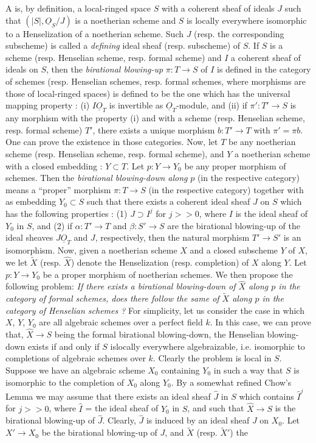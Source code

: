 A is, by definition, a local-ringed space $S$ with a coherent sheaf of ideals $J$ such that $(|S|,\underline{O}_{S}/J)$ is a noetherian scheme and $S$ is locally everywhere isomorphic to a Henselization of a noetherian scheme. Such $J$ (resp. the corresponding subscheme) is called a {\em defining} ideal sheaf (resp. subscheme) of $S$. If $S$ is a scheme (resp. Henselian scheme, resp. formal scheme) and $I$ a coherent sheaf of ideals on $S$, then the {\em birational blowing-up} $\pi:T\to S$ of $I$ is defined in the category of schemes (resp. Henselian schemes, resp. formal schemes, where morphisms are those of local-ringed spaces) is defined to be the one which has the universal mapping property : (i) $I\underline{O}_{T}$ is invertible as $\underline{O}_{T}$-module, and (ii) if $\pi':T'\to S$ is any morphism with the property (i) and with a scheme (resp. Henselian scheme, resp. formal scheme) $T'$, there exists a unique morphism $b:T'\to T$ with $\pi'=\pi b$. One can prove the existence in those categories. Now, let $T$ be any noetherian scheme (resp. Henselian scheme, resp. formal scheme), and $Y$ a noetherian scheme with a closed embedding : $Y\subset T$. Let $p:Y\to Y_{0}$ be any proper morphism of schemes. Then the {\em birational blowing-down along} $p$ (in the respective category) means a ``proper'' morphism $\pi:T\to S$ (in the respective category) together with as embedding $Y_{0}\subset S$ such that there exists a coherent ideal sheaf $J$ on $S$ which has the following properties : (1) $J\supset I^{j}$ for $j>>0$, where $I$ is the ideal sheaf of $Y_{0}$ in $S$, and (2) if $\alpha:T'\to T$ and $\beta:S'\to S$ are the birational blowing-up of the ideal sheaves $J\underline{O}_{T}$ and $J$, respectively, then the natural morphism $T'\to S'$ is an isomorphism. Now, given a noetherian scheme $X$ and a closed subscheme $Y$ of $X$, we let $\widetilde{X}$ (resp. $\widehat{X}$) denote the Henselization (resp. completion) of $X$ along $Y$. Let $p:Y\to Y_{0}$ be a proper morphism of noetherian schemes. We then propose the following problem: {\em If there exists a birational blowing-down of $\widehat{X}$ along $p$ in the category of formal schemes, does there follow the same of $\widetilde{X}$ along $p$ in the category of Henselian schemes ?} For simplicity, let us consider the case in which $X$, $Y$, $Y_{0}$ are all algebraic schemes over a perfect field $k$. In this case, we can prove that, $\widehat{X}\to S$ being the formal birational blowing-down, the Henselian blowing-down exists if and only if $S$ is\pageoriginale locally everywhere algebraizable, i.e. isomorphic to completions of algebraic schemes over $k$. Clearly the problem is local in $S$. Suppose we have an algebraic scheme $X_{0}$ containing $Y_{0}$ in such a way that $S$ is isomorphic to the completion of $X_{0}$ along $Y_{0}$. By a somewhat refined Chow's Lemma we may assume that there exists an ideal sheaf $\widehat{J}$ in $S$ which contains $\widehat{I}^{j}$ for $j>>0$, where $\widehat{I}$ = the ideal sheaf of $Y_{0}$ in $S$, and such that $\widehat{X}\to S$ is the birational blowing-up of $\widehat{J}$. Clearly, $\widehat{J}$ is induced by an ideal sheaf $J$ on $X_{0}$. Let $X'\to X_{0}$ be the birational blowing-up of $J$, and $\widetilde{X}$ (resp. $\widetilde{X}'$) the 